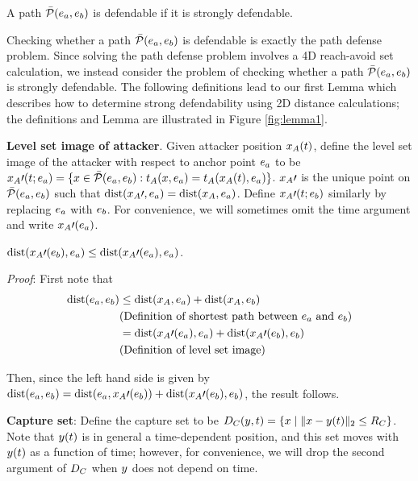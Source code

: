 \begin{rem}
A path $\bar{\mathcal{P}}(e_a,e_b)$ is defendable if it is strongly defendable.
\end{rem}

Checking whether a path $\bar{\mathcal{P}}(e_a,e_b)$ is defendable is exactly the path defense problem. Since solving the path defense problem involves a 4D reach-avoid set calculation, we instead consider the problem of checking whether a path $\bar{\mathcal{P}}(e_a,e_b)$ is strongly defendable. The following definitions lead to our first Lemma which describes how to determine strong defendability using 2D distance calculations; the definitions and Lemma are illustrated in Figure \ref{fig:lemma1}.

\begin{defn} %
\textbf{Level set image of attacker}. Given attacker position $x_A(t)$, define the level set image of the attacker with respect to anchor point $e_a$ to be $x_A\prime(t;e_a) = \{x\in\bar{\mathcal{P}}(e_a,e_b): t_A(x,e_a) = t_A(x_A(t),e_a)\}$. $x_A\prime$ is the unique point on $\bar{\mathcal{P}}(e_a,e_b)$ such that $\text{dist}(x_A\prime, e_a)=\text{dist}(x_A,e_a)$. Define $x_A\prime(t;e_b)$ similarly by replacing $e_a$ with $e_b$. For convenience, we will sometimes omit the time argument and write $x_A\prime(e_a)$.
\end{defn}

\begin{rem}
\label{rem:image_of_a}
$\text{dist}(x_A\prime(e_b),e_a) \le \text{dist}(x_A\prime(e_a),e_a)$. 

\textit{Proof}:
First note that
\begin{equation*}
\begin{aligned}
\text{dist}(e_a,e_b) &\le \text{dist}(x_A,e_a) + \text{dist}(x_A,e_b)\\
& \text{(Definition of shortest path between $e_a$ and $e_b$)} \\
& = \text{dist}(x_A\prime(e_a),e_a) + \text{dist}(x_A\prime(e_b),e_b) \\
& \text{(Definition of level set image)}
\end{aligned}
\end{equation*}

Then, since the left hand side is given by $\text{dist}(e_a,e_b) = \text{dist}(e_a,x_A\prime(e_b))+\text{dist}(x_A\prime(e_b),e_b)$, the result follows.
\end{rem}

\begin{defn} %
\textbf{Capture set}: Define the capture set to be $D_C(y,t)=\{x \mid \|x-y(t)\|_2\leq R_C\}$. Note that $y(t)$ is in general a time-dependent position, and this set moves with $y(t)$ as a function of time; however, for convenience, we will drop the second argument of $D_C$ when $y$ does not depend on time.
\end{defn}

